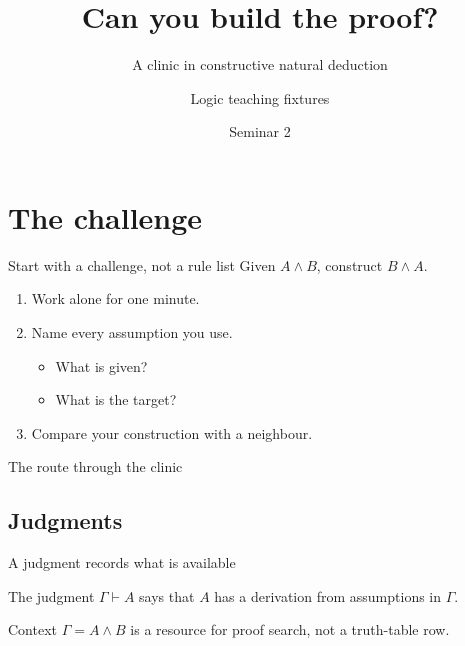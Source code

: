 \documentclass[12pt,aspectratio=43]{beamer}
\title{Can you build the proof?}
\subtitle{A clinic in constructive natural deduction}
\author{Logic teaching fixtures}
\date{Seminar 2}
\newcommand{\seq}[2]{#1\vdash #2}
\begin{document}
\section{The challenge}
\begin{frame}{Start with a challenge, not a rule list}
\centering
\Large Given $A\land B$, construct $B\land A$.
\bigskip
\normalsize
\begin{enumerate}
\item Work alone for one minute.
\item Name every assumption you use.
\begin{itemize}\item What is given?\item What is the target?\end{itemize}
\item Compare your construction with a neighbour.
\end{enumerate}
\end{frame}
\begin{frame}[plain]\titlepage\end{frame}
\begin{frame}{The route through the clinic}
\tableofcontents
\end{frame}
\subsection{Judgments}
\begin{frame}{A judgment records what is available}
\begin{definition}
The judgment $\seq{\Gamma}{A}$ says that $A$ has a derivation from assumptions in $\Gamma$.
\end{definition}
\begin{exampleblock}{Context}
$\Gamma=A\land B$ is a resource for proof search, not a truth-table row.
\end{exampleblock}
\end{frame}
\end{document}
